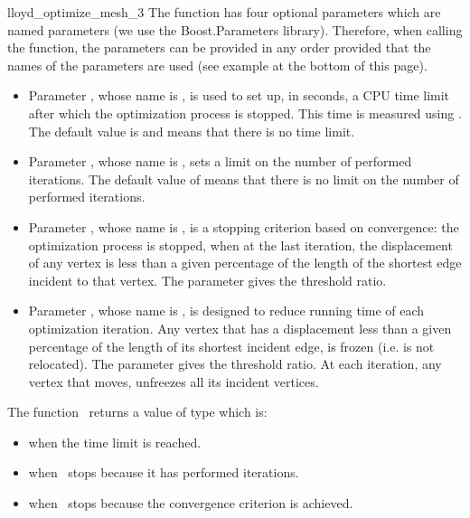 \begin{ccRefFunction}{lloyd_optimize_mesh_3}
The function has four optional parameters which are named parameters (we use the Boost.Parameters library). 
Therefore, when calling the function,  the parameters can be provided in any order 
provided that the names of the parameters are used
 (see example at the bottom of this page).
\begin{itemize}
\item
Parameter , whose name is ,
 is used to set up, in seconds,
 a CPU time limit after which the optimization process is stopped. This time is
 measured using .
The default value is  and means that there is no time limit.
\item  Parameter , whose name is 
 , sets a limit on the
number of performed  iterations. The default value of  means that there is 
no limit on the number of performed iterations.
\item  Parameter , whose name is 
 , is a stopping  criterion based on convergence: 
the optimization process is stopped, when at the last iteration,
the displacement of any vertex is less than a given percentage of the
length of the shortest  edge incident to that vertex.
The parameter  gives the threshold ratio.
\item
Parameter , whose name is ,
is designed to reduce running time of each optimization iteration. Any vertex 
that has
a displacement less than a given percentage of the length of its shortest incident edge,   is frozen (i.e. is
not relocated). The parameter  gives the threshold ratio. At each iteration, any vertex that
moves,  unfreezes all its incident vertices.
\end{itemize}

The function \ccRefName\ returns a value of type 
which is:
\begin{itemize}
\item {} when the time limit is reached.
\item {} when \ccRefName\ stops because it has performed  iterations.
\item {} when \ccRefName\ stops because the convergence criterion
is achieved.
\end{itemize}





\end{ccRefFunction}
